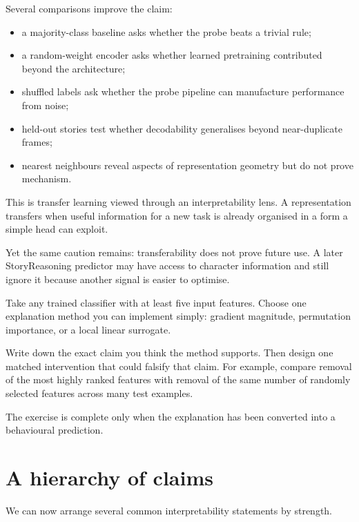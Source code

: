 Several comparisons improve the claim:
\begin{itemize}[leftmargin=*]
  \item a majority-class baseline asks whether the probe beats a trivial rule;
  \item a random-weight encoder asks whether learned pretraining contributed beyond the architecture;
  \item shuffled labels ask whether the probe pipeline can manufacture performance from noise;
  \item held-out stories test whether decodability generalises beyond near-duplicate frames;
  \item nearest neighbours reveal aspects of representation geometry but do not prove mechanism.
\end{itemize}

This is transfer learning viewed through an interpretability lens. A representation transfers when useful information for a new task is already organised in a form a simple head can exploit.

Yet the same caution remains: transferability does not prove future use. A later StoryReasoning predictor may have access to character information and still ignore it because another signal is easier to optimise.

\begin{optionalexercise}[title={Optional coding --- explanation claims as tests}]
Take any trained classifier with at least five input features. Choose one explanation method you can implement simply: gradient magnitude, permutation importance, or a local linear surrogate.

Write down the exact claim you think the method supports. Then design one matched intervention that could falsify that claim. For example, compare removal of the most highly ranked features with removal of the same number of randomly selected features across many test examples.

The exercise is complete only when the explanation has been converted into a behavioural prediction.
\end{optionalexercise}

\section{A hierarchy of claims}

We can now arrange several common interpretability statements by strength.

